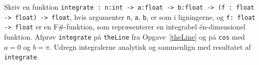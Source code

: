 Skriv en funktion \lstinline{integrate : n:int -> a:float -> b:float -> (f : float -> float) -> float}, hvis argumenter \lstinline{n}, \lstinline{a}, \lstinline{b}, er som i ligningerne, og \lstinline{f: float -> float} er en F\#-funktion, som repr\ae senterer en integrabel \'{e}n-dimensionel funktion. Afprøv \lstinline{integrate} på \lstinline{theLine} fra Opgave~\ref{theLine} og på \lstinline{cos} med $a=0$ og $b=\pi$. Udregn integralerne analytisk og sammenlign med resultatet af \lstinline{integrate}.